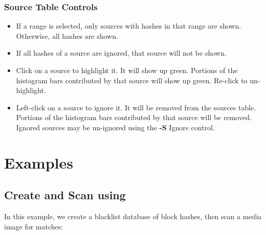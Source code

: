 \documentclass[11pt,fleqn]{article} %
\begin{document}
\subsubsection{Source Table Controls}
\begin{itemize}
\item If a range is selected, only sources with hashes in that range are shown. Otherwise, all hashes are shown.
\item If all hashes of a source are ignored, that source will not be shown.
\item Click on a source to highlight it. It will show up green. Portions of the histogram bars contributed  by that source will show up green. Re-click to un-highlight.
\item Left-click on a source to ignore it. It will be removed from the sources table. Portions of the histogram bars contributed  by that source will be removed. Ignored sources may be un-ignored using the \textbf{-S} Ignore control.
\end{itemize}

\section{Examples}
\subsection{Create and Scan using \sscope}
In this example, we create a blacklist database of block hashes, then scan a media image for matches:
\end{document}
